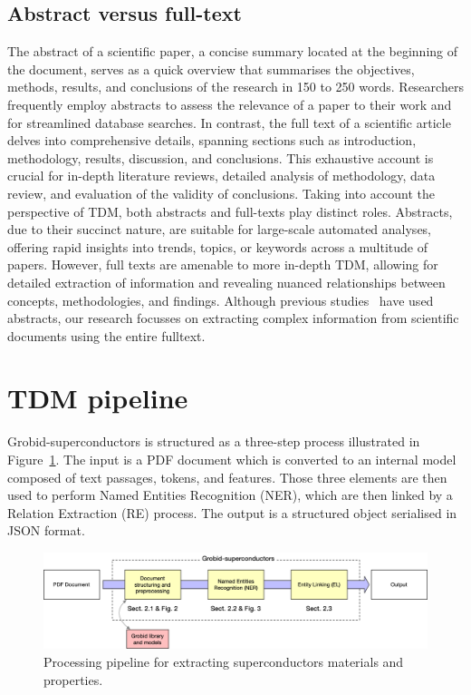 \subsection{Abstract versus full-text}
The abstract of a scientific paper, a concise summary located at the beginning of the document, serves as a quick overview that summarises the objectives, methods, results, and conclusions of the research in 150 to 250 words. 
Researchers frequently employ abstracts to assess the relevance of a paper to their work and for streamlined database searches. 
In contrast, the full text of a scientific article delves into comprehensive details, spanning sections such as introduction, methodology, results, discussion, and conclusions. This exhaustive account is crucial for in-depth literature reviews, detailed analysis of methodology, data review, and evaluation of the validity of conclusions.
Taking into account the perspective of TDM, both abstracts and full-texts play distinct roles. Abstracts, due to their succinct nature, are suitable for large-scale automated analyses, offering rapid insights into trends, topics, or keywords across a multitude of papers. However, full texts are amenable to more in-depth TDM, allowing for detailed extraction of information and revealing nuanced relationships between concepts, methodologies, and findings. 
Although previous studies~\cite{yamaguchi-etal-2020-sc} have used abstracts, our research focusses on extracting complex information from scientific documents using the entire fulltext.


\section{TDM pipeline}
\label{subsubsec:document-structuring}

Grobid-superconductors is structured as a three-step process illustrated in Figure~\ref{fig:pipeline-overview}. The input is a PDF document which is converted to an internal model composed of text passages, tokens, and features. Those three elements are then used to perform Named Entities Recognition (NER), which are then linked by a Relation Extraction (RE) process. 
The output is a structured object serialised in JSON format.

\begin{figure}[htbp]
    \includegraphics[width=\textwidth]{figures/automatic_extraction_supercon/schema-architecture-colors.png}
    \caption{Processing pipeline for extracting superconductors materials and properties. }
    \label{fig:pipeline-overview}
\end{figure}

